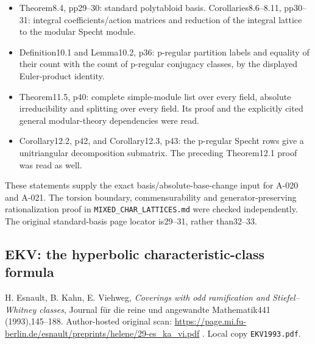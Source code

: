 \documentclass[
  10pt,
]{article}
\providecommand{\tightlist}{%
  \setlength{\itemsep}{0pt}\setlength{\parskip}{0pt}}
\providecommand{\tightlist}{\setlength{\itemsep}{0pt}\setlength{\parskip}{0pt}}
\begin{document}
\begin{itemize}
\tightlist
\item
  Theorem8.4, pp29--30: standard polytabloid basis.
  Corollaries8.6--8.11, pp30--31: integral coefficients/action matrices
  and reduction of the integral lattice to the modular Specht module.
\item
  Definition10.1 and Lemma10.2, p36: p-regular partition labels and
  equality of their count with the count of p-regular conjugacy classes,
  by the displayed Euler-product identity.
\item
  Theorem11.5, p40: complete simple-module list over every field,
  absolute irreducibility and splitting over every field. Its proof and
  the explicitly cited general modular-theory dependencies were read.
\item
  Corollary12.2, p42, and Corollary12.3, p43: the p-regular Specht rows
  give a unitriangular decomposition submatrix. The preceding
  Theorem12.1 proof was read as well.
\end{itemize}

These statements supply the exact basis/absolute-base-change input for
A-020 and A-021. The torsion boundary, commensurability and
generator-preserving rationalization proof in
\texttt{\small MIXED\_\allowbreak{}CHAR\_\allowbreak{}LATTICES.md} were
checked independently. The original standard-basis page locator
is29--31, rather than32--33.

\subsection{EKV: the hyperbolic characteristic-class
formula}\label{ekv-the-hyperbolic-characteristic-class-formula}

H. Esnault, B. Kahn, E. Viehweg, \emph{Coverings with odd ramification
and Stiefel--Whitney classes}, Journal für die reine und angewandte
Mathematik441 (1993),145--188. Author-hosted original scan:
\url{https://page.mi.fu-berlin.de/esnault/preprints/helene/29-es_ka_vi.pdf}
. Local copy \texttt{\small EKV1993.pdf}.
\end{document}
